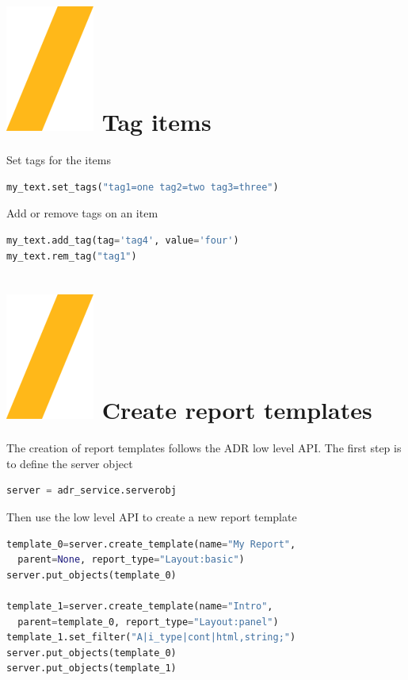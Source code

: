 \documentclass[9pt,landscape]{article}
\begin{document}
\begin{multicols}{3}
\section{\includegraphics[height=\fontcharht\font`\S]{slash.png}  Tag items}
Set tags for the items

\begin{lstlisting}[language=Python]
my_text.set_tags("tag1=one tag2=two tag3=three")
\end{lstlisting} 

Add or remove tags on an item
\begin{lstlisting}[language=Python]
my_text.add_tag(tag='tag4', value='four')
my_text.rem_tag("tag1")
\end{lstlisting} 

\section{\includegraphics[height=\fontcharht\font`\S]{slash.png} Create report templates}
The creation of report templates follows the ADR low level API. The first step is to define 
the server object
\begin{lstlisting}[language=Python]
server = adr_service.serverobj
\end{lstlisting}
Then use the low level API to create a new report template
\begin{lstlisting}[language=Python]
template_0=server.create_template(name="My Report", 
  parent=None, report_type="Layout:basic")
server.put_objects(template_0)

template_1=server.create_template(name="Intro", 
  parent=template_0, report_type="Layout:panel")
template_1.set_filter("A|i_type|cont|html,string;")
server.put_objects(template_0)
server.put_objects(template_1)


\end{lstlisting}
\end{multicols}
\end{document}
